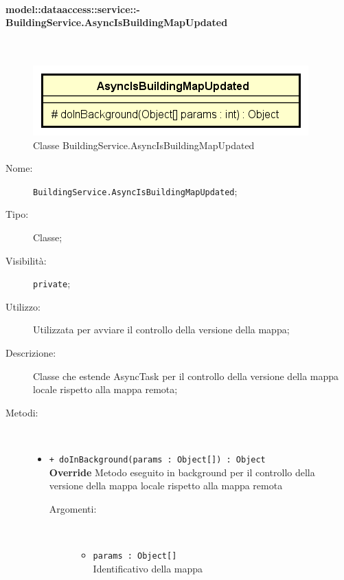 \documentclass[../DefinizioneDiProdotto.tex]{subfiles}
\begin{document}
\paragraph{model::dataaccess::service::-\\BuildingService.AsyncIsBuildingMapUpdated}
\
\begin{figure}[H]
	\centering
	\includegraphics[width=\maxwidth]{img/BuildingService-AsyncIsBuildingMapUpdated.png}
	\caption{Classe BuildingService.AsyncIsBuildingMapUpdated}\label{fig:model::dataaccess::service::BuildingService.AsyncIsBuildingMapUpdated} 
\end{figure}
\begin{description}
	\item[Nome:] \texttt{BuildingService.AsyncIsBuildingMapUpdated};
	\item[Tipo:] Classe;
	\item[Visibilità:] \texttt{private};
	\item[Utilizzo:] Utilizzata per avviare il controllo della versione della mappa;
	\item[Descrizione:] Classe che estende AsyncTask per il controllo della versione della mappa locale rispetto alla mappa remota;
	\item[Metodi:] \
	\begin{itemize}
		\item \texttt{+ doInBackground(params : Object[]) : Object}\\
		\textbf{Override} Metodo eseguito in background per il controllo della versione della mappa locale rispetto alla mappa remota
		\begin{description}
			\item[Argomenti:] \
			\begin{itemize}
				\item \texttt{params : Object[]}\\
				Identificativo della mappa\end{itemize}
		\end{description}
	\end{itemize}
\end{description}
\end{document}
